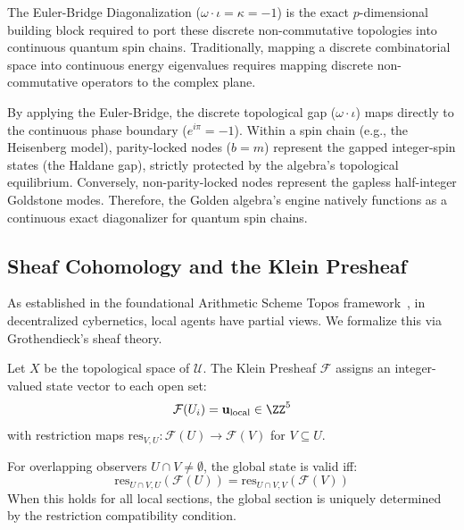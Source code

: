 The Euler-Bridge Diagonalization ($\omega \cdot \iota = \kappa = -1$) is the exact $p$-dimensional building block required to port these discrete non-commutative topologies into continuous quantum spin chains. Traditionally, mapping a discrete combinatorial space into continuous energy eigenvalues requires mapping discrete non-commutative operators to the complex plane. 

By applying the Euler-Bridge, the discrete topological gap ($\omega \cdot \iota$) maps directly to the continuous phase boundary ($e^{i\pi} = -1$). Within a spin chain (e.g., the Heisenberg model), parity-locked nodes ($b=m$) represent the gapped integer-spin states (the Haldane gap), strictly protected by the algebra's topological equilibrium. Conversely, non-parity-locked nodes represent the gapless half-integer Goldstone modes. Therefore, the Golden algebra's engine natively functions as a continuous exact diagonalizer for quantum spin chains.

\subsection{Sheaf Cohomology and the Klein Presheaf}

As established in the foundational Arithmetic Scheme Topos framework~\cite{larue_lc}, in decentralized cybernetics, local agents have partial views. We formalize this via Grothendieck's sheaf theory.

\begin{definition}\label{def:presheaf}
Let $X$ be the topological space of $\mathcal{U}$. The Klein Presheaf $\mathcal{F}$ assigns an integer-valued state vector to each open set:
$$\mathcal{F}(U_i) = \mathbf{u}_{\text{local}} \in \ZZ^5$$
with restriction maps $\mathrm{res}_{V,U}: \mathcal{F}(U) \to \mathcal{F}(V)$ for $V \subseteq U$.
\end{definition}

\begin{theorem}\label{thm:gluing}
For overlapping observers $U \cap V \neq \emptyset$, the global state is valid iff:
$$\mathrm{res}_{U \cap V, U}(\mathcal{F}(U)) = \mathrm{res}_{U \cap V, V}(\mathcal{F}(V))$$
When this holds for all local sections, the global section is uniquely determined by the restriction compatibility condition.
\end{theorem}

